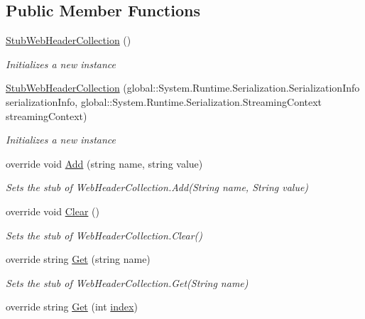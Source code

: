 \subsection*{Public Member Functions}
\begin{DoxyCompactItemize}
\item 
\hyperlink{class_system_1_1_net_1_1_fakes_1_1_stub_web_header_collection_a1c0cbc7b2f48df68260e9f37456456f2}{Stub\-Web\-Header\-Collection} ()
\begin{DoxyCompactList}\small\item\em Initializes a new instance\end{DoxyCompactList}\item 
\hyperlink{class_system_1_1_net_1_1_fakes_1_1_stub_web_header_collection_a0ed15085682ed9b1007438c692a64979}{Stub\-Web\-Header\-Collection} (global\-::\-System.\-Runtime.\-Serialization.\-Serialization\-Info serialization\-Info, global\-::\-System.\-Runtime.\-Serialization.\-Streaming\-Context streaming\-Context)
\begin{DoxyCompactList}\small\item\em Initializes a new instance\end{DoxyCompactList}\item 
override void \hyperlink{class_system_1_1_net_1_1_fakes_1_1_stub_web_header_collection_a1662b155198d8e43146be455d29f7a30}{Add} (string name, string value)
\begin{DoxyCompactList}\small\item\em Sets the stub of Web\-Header\-Collection.\-Add(\-String name, String value)\end{DoxyCompactList}\item 
override void \hyperlink{class_system_1_1_net_1_1_fakes_1_1_stub_web_header_collection_ae6ed2f0cad85621c4d66f9da6ec6cefb}{Clear} ()
\begin{DoxyCompactList}\small\item\em Sets the stub of Web\-Header\-Collection.\-Clear()\end{DoxyCompactList}\item 
override string \hyperlink{class_system_1_1_net_1_1_fakes_1_1_stub_web_header_collection_af3b13110d33c54ef4aa92f9b3dd5fccd}{Get} (string name)
\begin{DoxyCompactList}\small\item\em Sets the stub of Web\-Header\-Collection.\-Get(\-String name)\end{DoxyCompactList}\item 
override string \hyperlink{class_system_1_1_net_1_1_fakes_1_1_stub_web_header_collection_a9d928bb2c474074ed88ec50a004ef8d0}{Get} (int \hyperlink{jquery-1_810_82-vsdoc_8js_a75bb12d1f23302a9eea93a6d89d0193e}{index})

\end{DoxyCompactItemize}
